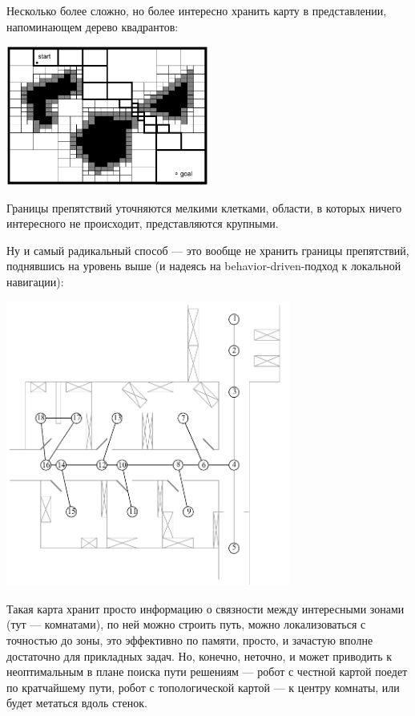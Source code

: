 \documentclass{../../text-style}
\begin{document}
Несколько более сложно, но более интересно хранить карту в представлении, напоминающем дерево квадрантов:

\begin{center}
    \includegraphics[width=0.5\textwidth]{variableCellGrid.png}
\end{center}

Границы препятствий уточняются мелкими клетками, области, в которых ничего интересного не происходит, представляются крупными.

Ну и самый радикальный способ --- это вообще не хранить границы препятствий, поднявшись на уровень выше (и надеясь на behavior-driven-подход к локальной навигации):

\begin{center}
    \includegraphics[width=0.7\textwidth]{topologicalMap.png}
\end{center}

Такая карта хранит просто информацию о связности между интересными зонами (тут --- комнатами), по ней можно строить путь, можно локализоваться с точностью до зоны, это эффективно по памяти, просто, и зачастую вполне достаточно для прикладных задач.
Но, конечно, неточно, и может приводить к неоптимальным в плане поиска пути решениям --- робот с честной картой поедет по кратчайшему пути, робот с топологической картой --- к центру комнаты, или будет метаться вдоль стенок.
\end{document}
